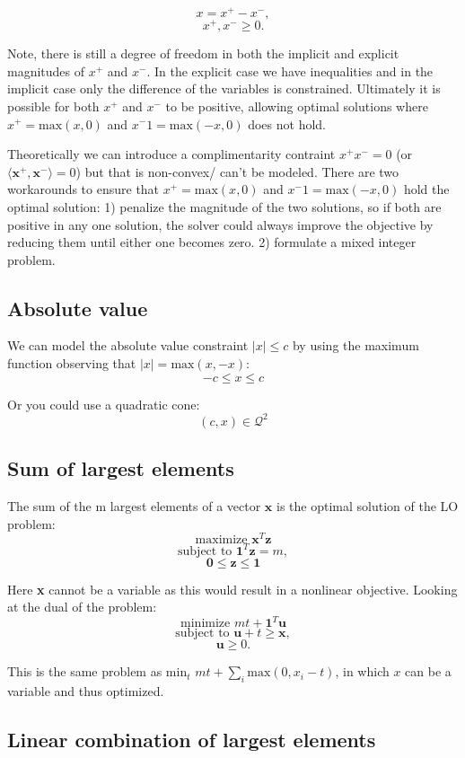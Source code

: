 \documentclass{article}
\begin{document}
$$x = x^+ - x^-,$$
$$x^+, x^- \geq 0.$$

Note, there is still a degree of freedom in both the implicit and explicit magnitudes of $x^+$ and $x^-$. In the
explicit case we have inequalities and in the implicit case only the difference of the variables is constrained.
Ultimately it is possible for both $x^+$ and $x^-$ to be positive, allowing optimal solutions where $x^+ = \text{max}(x,0)$
and $x^-1=\text{max}(-x,0)$ does not hold.

Theoretically we can introduce a complimentarity contraint $x^+x^-=0$ (or $\langle\textbf{x}^+,\textbf{x}^-\rangle=0$)
but that is non-convex/ can't be modeled. There are two workarounds to ensure that $x^+ = \text{max}(x,0)$
and $x^-1=\text{max}(-x,0)$ hold the optimal solution: 1) penalize the magnitude of the two solutions, so if both
are positive in any one solution, the solver could always improve the objective by reducing them until either one
becomes zero. 2) formulate a mixed integer problem.

\subsection{Absolute value}
We can model the absolute value constraint $|x| \leq c$ by using the maximum function observing that
$|x|=\text{max}(x,-x)$:
$$-c\leq x\leq c$$

Or you could use a quadratic cone:
$$(c,x)\in \mathcal{Q}^2$$

\subsection{Sum of largest elements}

The sum of the m largest elements of a vector $\mathbf{x}$ is the optimal solution of the LO problem:
$$\text{maximize } \mathbf{x}^T\mathbf{z}$$
$$\text{subject to } \mathbf{1}^T\mathbf{z}=m,$$
$$\mathbf{0}\leq\mathbf{z}\leq\mathbf{1}$$

Here \textbf{x} cannot be a variable as this would result in a nonlinear objective. Looking at the dual of
the problem:
$$\text{minimize } mt + \mathbf{1}^T\mathbf{u}$$
$$\text{subject to } \mathbf{u} + t \geq \mathbf{x},$$
$$\mathbf{u} \geq 0.$$

This is the same problem as min$_t$ $mt + \sum_i\text{max}(0,x_i-t)$, in which $x$ can be a variable and thus optimized.

\subsection{Linear combination of largest elements}
\end{document}
